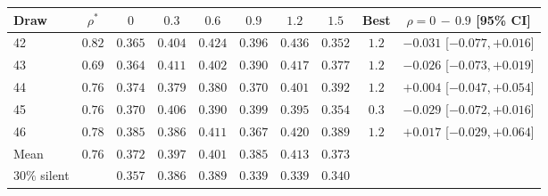 \begin{tabular}{lccccccccc}
\toprule
Draw & $\rho^\ast$ & $0$ & $0.3$ & $0.6$ & $0.9$ & $1.2$ & $1.5$ & Best & $\rho{=}0$ $-$ $0.9$ [95\% CI] \\
\midrule
42 & $0.82$ & $0.365$ & $0.404$ & $0.424$ & $0.396$ & $0.436$ & $0.352$ & $1.2$ & $-0.031$ [$-0.077,+0.016$] \\
43 & $0.69$ & $0.364$ & $0.411$ & $0.402$ & $0.390$ & $0.417$ & $0.377$ & $1.2$ & $-0.026$ [$-0.073,+0.019$] \\
44 & $0.76$ & $0.374$ & $0.379$ & $0.380$ & $0.370$ & $0.401$ & $0.392$ & $1.2$ & $+0.004$ [$-0.047,+0.054$] \\
45 & $0.76$ & $0.370$ & $0.406$ & $0.390$ & $0.399$ & $0.395$ & $0.354$ & $0.3$ & $-0.029$ [$-0.072,+0.016$] \\
46 & $0.78$ & $0.385$ & $0.386$ & $0.411$ & $0.367$ & $0.420$ & $0.389$ & $1.2$ & $+0.017$ [$-0.029,+0.064$] \\
\midrule
Mean & $0.76$ & $0.372$ & $0.397$ & $0.401$ & $0.385$ & $0.413$ & $0.373$ & & \\
$30\%$ silent & & $0.357$ & $0.386$ & $0.389$ & $0.339$ & $0.339$ & $0.340$ & & \\
\bottomrule
\end{tabular}
